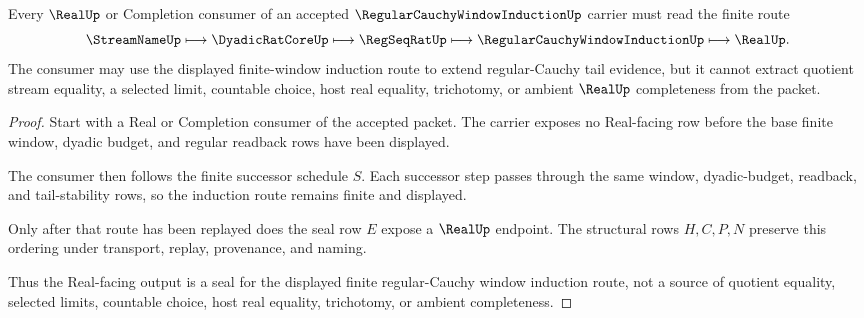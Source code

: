 \begin{theorem}
\label{thm:regular-cauchy-window-induction-real-seal}
Every $\RealUp$ or Completion consumer of an accepted $\RegularCauchyWindowInductionUp$ carrier must read the finite route
$$
\StreamNameUp \longmapsto \DyadicRatCoreUp \longmapsto \RegSeqRatUp \longmapsto \RegularCauchyWindowInductionUp \longmapsto \RealUp .
$$
The consumer may use the displayed finite-window induction route to extend regular-Cauchy tail evidence, but it cannot extract quotient stream equality, a selected limit, countable choice, host real equality, trichotomy, or ambient $\RealUp$ completeness from the packet.
\end{theorem}
\begin{proof}
Start with a Real or Completion consumer of the accepted packet. The carrier exposes no Real-facing row before the base finite window, dyadic budget, and regular readback rows have been displayed.

The consumer then follows the finite successor schedule $S$. Each successor step passes through the same window, dyadic-budget, readback, and tail-stability rows, so the induction route remains finite and displayed.

Only after that route has been replayed does the seal row $E$ expose a $\RealUp$ endpoint. The structural rows $H,C,P,N$ preserve this ordering under transport, replay, provenance, and naming.

Thus the Real-facing output is a seal for the displayed finite regular-Cauchy window induction route, not a source of quotient equality, selected limits, countable choice, host real equality, trichotomy, or ambient completeness.
\end{proof}


